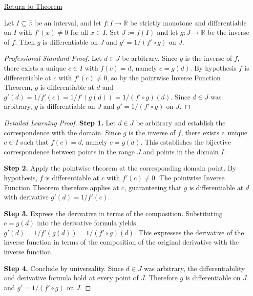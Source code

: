 \newpage
{}
\label{prf:derivative-inverse-function-on-interval}

\begin{remark*}[Return]
\hyperref[thm:inverse-function-theorem-global]{Return to Theorem}
\end{remark*}

\begin{theorem*}
Let $I \subseteq \mathbb{R}$ be an interval, and let $f : I \to \mathbb{R}$ be strictly monotone and differentiable on $I$ with $f'(x) \neq 0$ for all $x \in I$. Set $J := f(I)$ and let $g : J \to \mathbb{R}$ be the inverse of $f$. Then $g$ is differentiable on $J$ and $g' = 1/(f' \circ g)$ on $J$.
\end{theorem*}

\begin{proof}[Professional Standard Proof]
\LRAProofBodyStart
Let $d \in J$ be arbitrary. Since $g$ is the inverse of $f$, there exists a unique $c \in I$ with $f(c) = d$, namely $c = g(d)$. By hypothesis $f$ is differentiable at $c$ with $f'(c) \neq 0$, so by the pointwise Inverse Function Theorem, $g$ is differentiable at $d$ and $g'(d) = 1/f'(c) = 1/f'(g(d)) = 1/(f' \circ g)(d)$. Since $d \in J$ was arbitrary, $g$ is differentiable on $J$ and $g' = 1/(f' \circ g)$ on $J$.
\end{proof}

\begin{proof}[Detailed Learning Proof]
\LRAProofBodyStart

\textbf{Step 1.} Let $d \in J$ be arbitrary and establish the correspondence with the domain. Since $g$ is the inverse of $f$, there exists a unique $c \in I$ such that $f(c) = d$, namely $c = g(d)$. This establishes the bijective correspondence between points in the range $J$ and points in the domain $I$.

\textbf{Step 2.} Apply the pointwise theorem at the corresponding domain point. By hypothesis, $f$ is differentiable at $c$ with $f'(c) \neq 0$. The pointwise Inverse Function Theorem therefore applies at $c$, guaranteeing that $g$ is differentiable at $d$ with derivative $g'(d) = 1/f'(c)$.

\textbf{Step 3.} Express the derivative in terms of the composition. Substituting $c = g(d)$ into the derivative formula yields $g'(d) = 1/f'(g(d)) = 1/(f' \circ g)(d)$. This expresses the derivative of the inverse function in terms of the composition of the original derivative with the inverse function.

\textbf{Step 4.} Conclude by universality. Since $d \in J$ was arbitrary, the differentiability and derivative formula hold at every point of $J$. Therefore $g$ is differentiable on $J$ and $g' = 1/(f' \circ g)$ on $J$.
\end{proof}

